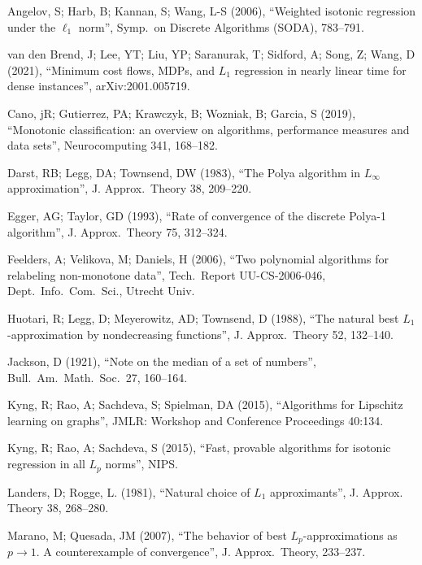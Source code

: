 \documentclass[11pt]{article}
\begin{document}
\begin{thebibliography}{99}


 Angelov, S; Harb, B; Kannan, S; Wang, L-S (2006), ``Weighted isotonic regression under the $\ell_1$ norm'', Symp.\ on Discrete Algorithms (SODA), 783--791.

 van den Brend, J; Lee, YT; Liu, YP; Saranurak, T; Sidford, A; Song, Z; Wang, D (2021),
 ``Minimum cost flows, MDPs, and $L_1$ regression in nearly linear time for dense instances'',
   arXiv:2001.005719.

 Cano, jR; Gutierrez, PA; Krawczyk, B; Wozniak, B; Garcia, S (2019),
``Monotonic classification: an overview on algorithms, performance measures and data sets'',
Neurocomputing 341, 168--182.

 Darst, RB; Legg, DA; Townsend, DW (1983), ``The Polya algorithm in $L_\infty$ approximation'', J. Approx.\ Theory 38, 209--220.

 Egger, AG; Taylor, GD (1993), ``Rate of convergence of the discrete Polya-1 algorithm'',
J. Approx.\ Theory 75, 312--324.

 Feelders, A; Velikova, M; Daniels, H (2006),
  ``Two polynomial algorithms for relabeling non-monotone data'',  
  Tech.\ Report UU-CS-2006-046, Dept.\ Info.\ Com.\ Sci., Utrecht Univ.

 Huotari, R; Legg, D; Meyerowitz, AD; Townsend, D (1988), ``The natural best $L_1$-approximation by nondecreasing functions'', J. Approx.\ Theory 52, 132--140.

 Jackson, D (1921), ``Note on the median of a set of numbers'', Bull.\ Am.\ Math.\ Soc.\  27, 160--164.

 Kyng, R; Rao, A; Sachdeva, S; Spielman, DA (2015), ``Algorithms for Lipschitz learning on graphs'',  JMLR: Workshop and Conference Proceedings 40:134.

 Kyng, R; Rao, A; Sachdeva, S (2015), ``Fast, provable algorithms for isotonic regression in all $L_p$ norms'', NIPS.

 Landers, D; Rogge, L. (1981), ``Natural choice of $L_1$ approximants'',
J. Approx. Theory 38, 268--280. 

 Marano, M; Quesada, JM (2007), ``The behavior of best $L_p$-approximations as $p \rightarrow 1$. A counterexample of convergence'', J. Approx.\ Theory, 233--237.


\end{thebibliography}
\end{document}
